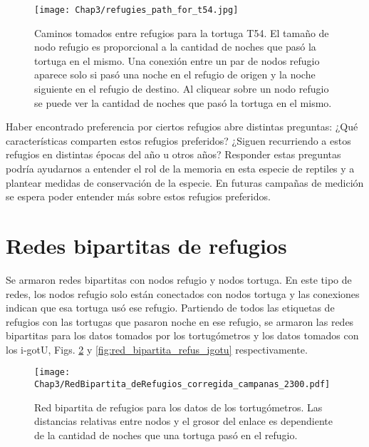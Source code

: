 \begin{figure}[ht]
    \begin{center}
        \texttt{[image: Chap3/refugies\_path\_for\_t54.jpg]}
        \caption[Caminos tomados entre refugios para la tortuga T54.]{Caminos tomados entre refugios para la tortuga T54. El tamaño de nodo refugio es proporcional a la cantidad de noches que pasó la tortuga en el mismo. Una conexión entre un par de nodos refugio aparece solo si pasó una noche en el refugio de origen y la noche siguiente en el refugio de destino. Al cliquear sobre un nodo refugio se puede ver la cantidad de noches que pasó la tortuga en el mismo.}
        \label{fig:ruta_refus_T54}
       
        \end{center}
\end{figure}
Haber encontrado preferencia por ciertos refugios abre distintas preguntas: ¿Qué características comparten estos refugios preferidos? ¿Siguen recurriendo a estos refugios en distintas épocas del año u otros años?  Responder estas preguntas podría ayudarnos a entender el rol de la memoria en esta especie de reptiles y a plantear medidas de conservación de la especie. En futuras campañas de medición se espera poder entender más sobre estos refugios preferidos.
 
 
 
\section{Redes bipartitas de refugios}
Se armaron redes bipartitas con nodos refugio y nodos tortuga. En este tipo de redes, los nodos refugio solo están conectados con nodos tortuga y las conexiones indican que esa tortuga usó ese refugio. Partiendo de todos las etiquetas de refugios con las tortugas que pasaron noche en ese refugio, se armaron las redes bipartitas para los datos tomados por los tortugómetros y los datos tomados con los i-gotU, Figs. \ref{fig:red_bipartita_refus_campanas} y \ref{fig:red_bipartita_refus_igotu} respectivamente.
 
\begin{figure}[ht]
    \begin{center}
        \texttt{[image: Chap3/RedBipartita\_deRefugios\_corregida\_campanas\_2300.pdf]}
        \caption[Red bipartita de refugios para los datos de los tortugómetros.]{Red bipartita de refugios para los datos de los tortugómetros. Las distancias relativas entre nodos y el grosor del enlace es dependiente de la cantidad de noches que una  tortuga pasó en el refugio. }
        \label{fig:red_bipartita_refus_campanas}
       
        \end{center}
\end{figure}
 
